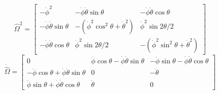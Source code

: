 \documentclass[graybox,envcountchap,sectrefs]{svmonoMuga}
\begin{document}
\[
\widehat{\Omega}^2=\begin{bmatrix}-\dot{\phi}^2 & -\dot{\phi}\dot{\theta}\sin{\theta} & -\dot{\phi}\dot{\theta}\cos{\theta}\\
-\dot{\phi}\dot{\theta}\sin{\theta} & -(\dot{\phi}^2\cos^2\theta+\dot{\theta}^2) & \dot{\phi}^2\sin{2\theta}/2\\
-\dot{\phi}\dot{\theta}\cos{\theta} & \dot{\phi}^2\sin{2\theta}/2 & -(\dot{\phi}^2\sin^2\theta+\dot{\theta}^2)\end{bmatrix}
\]
\[
\dot{\widehat{\Omega}}=\begin{bmatrix}0 & \ddot{\phi}\cos{\theta}-\dot{\phi}\dot{\theta}\sin{\theta} & -\ddot{\phi}\sin{\theta}-\dot{\phi}\dot{\theta}\cos{\theta}\\
-\ddot{\phi}\cos{\theta}+\dot{\phi}\dot{\theta}\sin{\theta} & 0 & -\ddot{\theta}\\
\ddot{\phi}\sin{\theta}+\dot{\phi}\dot{\theta}\cos{\theta} & \ddot{\theta} & 0\end{bmatrix}
\]
\end{document}
